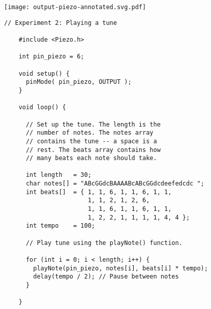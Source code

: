\hspace{0.1in}
\begin{minipage}[t]{0.49\tw}
  \vspace{0.0in}
  \texttt{[image: output-piezo-annotated.svg.pdf]}

  \vspace{0.7in}
  \begin{Verbatim}[gobble=3,fontsize=\small]
    // Experiment 2: Playing a tune

    #include <Piezo.h>

    int pin_piezo = 6;

    void setup() {
      pinMode( pin_piezo, OUTPUT );
    }

    void loop() {

      // Set up the tune. The length is the
      // number of notes. The notes array
      // contains the tune -- a space is a
      // rest. The beats array contains how
      // many beats each note should take.

      int length   = 30;
      char notes[] = "ABcGGdcBAAAABcABcGGdcdeefedcdc ";
      int beats[]  = { 1, 1, 6, 1, 1, 6, 1, 1,
                       1, 1, 2, 1, 2, 6,
                       1, 1, 6, 1, 1, 6, 1, 1,
                       1, 2, 2, 1, 1, 1, 1, 4, 4 };
      int tempo    = 100;

      // Play tune using the playNote() function.

      for (int i = 0; i < length; i++) {
        playNote(pin_piezo, notes[i], beats[i] * tempo);
        delay(tempo / 2); // Pause between notes
      }

    }
  \end{Verbatim}
\end{minipage}
\vspace{0.1in}

